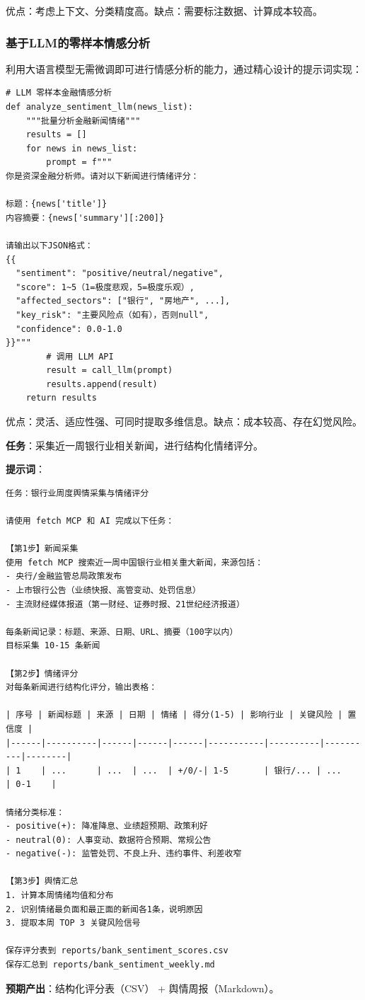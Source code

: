 优点：考虑上下文、分类精度高。缺点：需要标注数据、计算成本较高。

\subsubsection{基于LLM的零样本情感分析}

利用大语言模型无需微调即可进行情感分析的能力，通过精心设计的提示词实现：

\begin{lstlisting}[style=python]
# LLM 零样本金融情感分析
def analyze_sentiment_llm(news_list):
    """批量分析金融新闻情绪"""
    results = []
    for news in news_list:
        prompt = f"""
你是资深金融分析师。请对以下新闻进行情绪评分：

标题：{news['title']}
内容摘要：{news['summary'][:200]}

请输出以下JSON格式：
{{
  "sentiment": "positive/neutral/negative",
  "score": 1~5（1=极度悲观，5=极度乐观）,
  "affected_sectors": ["银行", "房地产", ...],
  "key_risk": "主要风险点（如有），否则null",
  "confidence": 0.0-1.0
}}"""
        # 调用 LLM API
        result = call_llm(prompt)
        results.append(result)
    return results
\end{lstlisting}

优点：灵活、适应性强、可同时提取多维信息。缺点：成本较高、存在幻觉风险。

\begin{practicebox}
\textbf{任务}：采集近一周银行业相关新闻，进行结构化情绪评分。

\textbf{提示词}：

\begin{lstlisting}
任务：银行业周度舆情采集与情绪评分

请使用 fetch MCP 和 AI 完成以下任务：

【第1步】新闻采集
使用 fetch MCP 搜索近一周中国银行业相关重大新闻，来源包括：
- 央行/金融监管总局政策发布
- 上市银行公告（业绩快报、高管变动、处罚信息）
- 主流财经媒体报道（第一财经、证券时报、21世纪经济报道）

每条新闻记录：标题、来源、日期、URL、摘要（100字以内）
目标采集 10-15 条新闻

【第2步】情绪评分
对每条新闻进行结构化评分，输出表格：

| 序号 | 新闻标题 | 来源 | 日期 | 情绪 | 得分(1-5) | 影响行业 | 关键风险 | 置信度 |
|------|----------|------|------|------|-----------|----------|----------|--------|
| 1    | ...      | ...  | ...  | +/0/-| 1-5       | 银行/... | ...      | 0-1    |

情绪分类标准：
- positive(+): 降准降息、业绩超预期、政策利好
- neutral(0): 人事变动、数据符合预期、常规公告
- negative(-): 监管处罚、不良上升、违约事件、利差收窄

【第3步】舆情汇总
1. 计算本周情绪均值和分布
2. 识别情绪最负面和最正面的新闻各1条，说明原因
3. 提取本周 TOP 3 关键风险信号

保存评分表到 reports/bank_sentiment_scores.csv
保存汇总到 reports/bank_sentiment_weekly.md
\end{lstlisting}

\textbf{预期产出}：结构化评分表（CSV） + 舆情周报（Markdown）。
\end{practicebox}

